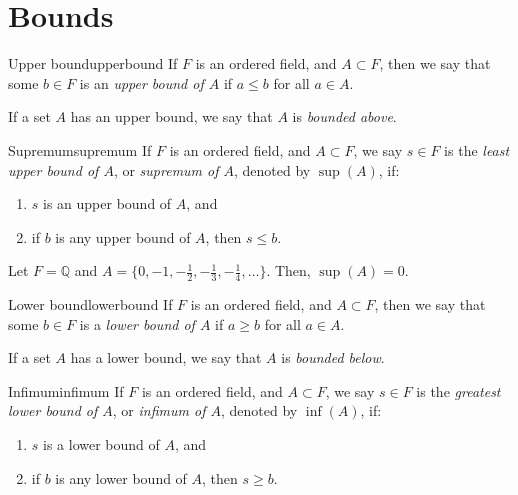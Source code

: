 
\section{Bounds}

\begin{defn}{Upper bound}{upperbound}
	If \(F\) is an ordered field, and \(A \subset F\), then we say that some \(b \in F\) is an \emph{upper bound of \(A\) } if \(a \leq b\) for all \(a \in A\).

	If a set \(A\) has an upper bound, we say that \(A\) is \emph{bounded above}.
\end{defn}

\begin{defn}{Supremum}{supremum}
	If \(F\) is an ordered field, and \(A \subset F\), we say \(s \in F\) is the \emph{least upper bound of \(A\)}, or \emph{supremum of \(A\)}, denoted by \(\sup(A)\), if:
	\begin{enumerate}
		\item \(s\) is an upper bound of \(A\), and
		\item if \(b\) is any upper bound of \(A\), then \(s \leq b\).
	\end{enumerate}
\end{defn}

\begin{exmp}{}{}
	Let \(F = \mathbb{Q}\) and \(A = \{0, -1, -\frac{1}{2}, -\frac{1}{3}, -\frac{1}{4}, \dots\}\). Then,  \(\sup(A) = 0\).
\end{exmp}

\begin{defn}{Lower bound}{lowerbound}
	If \(F\) is an ordered field, and \(A \subset F\), then we say that some \(b \in F\) is a \emph{lower bound of \(A\) } if \(a \geq b\) for all \(a \in A\).

	If a set \(A\) has a lower bound, we say that \(A\) is \emph{bounded below}.
\end{defn}

\begin{defn}{Infimum}{infimum}
	If \(F\) is an ordered field, and \(A \subset F\), we say \(s \in F\) is the \emph{greatest lower bound of \(A\)}, or \emph{infimum of \(A\)}, denoted by \(\inf(A)\), if:
	\begin{enumerate}
		\item \(s\) is a lower bound of \(A\), and
		\item if \(b\) is any lower bound of \(A\), then \(s \geq b\).
	\end{enumerate}
\end{defn}

